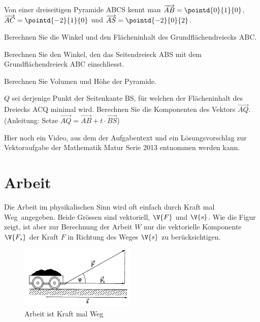 \documentclass[%
11pt,%
twoside,%
titlepage,%
german,%
headsepline%
]{scrartcl}
\begin{document}
\begin{ueb}
Von einer dreiseitigen Pyramide ABCS kennt man $\overrightarrow{AB}=\pointd{0}{1}{0}$, $\overrightarrow{AC}=\pointd{-2}{1}{0}$ und $\overrightarrow{AS}=\pointd{-2}{0}{2}$.
\begin{enumeratea}
\item Berechnen Sie die Winkel und den Flächeninhalt des Grundflächendreiecks ABC.
\item Berechnen Sie den Winkel, den das Seitendreieck ABS mit dem Grundflächendreieck ABC einschliesst.
\item Berechnen Sie Volumen und Höhe der Pyramide.
\item $Q$ sei derjenige Punkt der Seitenkante BS, für welchen der Flächeninhalt des Dreiecks ACQ minimal wird. Berechnen Sie die Komponenten des Vektors $\overrightarrow{AQ}$. (Anleitung: Setze $\overrightarrow{AQ}=\overrightarrow{AB}+t\cdot\overrightarrow{BS}$)
\end{enumeratea}

\end{ueb}

\begin{ueb}
Hier
noch ein Video, aus dem der Aufgabentext und ein Lösungsvorschlag zur Vektoraufgabe der Mathematik Matur Serie 2013 entnommen werden kann.
\end{ueb}

\section{Arbeit}
Die Arbeit im physikalischen Sinn wird oft einfach durch \glqq Kraft mal Weg\grqq\ angegeben. Beide Grössen sind vektoriell, $\V{F}$ und $\V{s}$. Wie die Figur zeigt, ist aber zur Berechnung der Arbeit $W$ nur die vektorielle Komponente $\V{F_s}$ der Kraft $F$ in Richtung des Weges $\V{s}$ zu berücksichtigen.

\begin{figure}[ht]
\begin{center}
\includegraphics[width=0.49\textwidth]{pictures/arbeit}
\end{center}
\caption{Arbeit ist \glqq Kraft mal Weg\grqq}
\end{figure}
\end{document}

